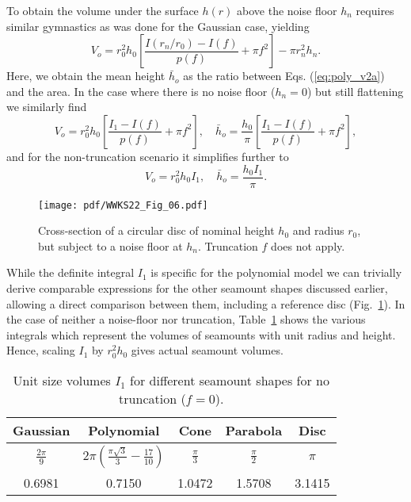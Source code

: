 To obtain the volume under the surface $h(r)$ above the noise floor $h_n$ requires similar gymnastics
as was done for the Gaussian case, yielding
\begin{equation}
	V_o = r_0^2 h_0 \left [ \frac{I(r_n/r_0) - I(f)}{p(f)} + \pi f^2 \right ] - \pi r_n^2h_n.
	\label{eq:poly_v2a}
\end{equation}
Here, we obtain the mean height $\bar{h}_o$ as the ratio between Eqs. (\ref{eq:poly_v2a}) and the area.
In the case where there is no noise floor ($h_n = 0$) but still flattening we similarly find
\begin{equation*}
	V_o = r_0^2 h_0 \left [ \frac{I_1 - I(f)}{p(f)} + \pi f^2 \right ],\quad\bar{h}_o = \frac{h_0}{\pi}\left [ \frac{I_1 - I(f)}{p(f)} + \pi f^2 \right ],
\end{equation*}
and for the non-truncation scenario it simplifies further to
\begin{equation*}
	V_o = r_0^2 h_0 I_1, \quad \bar{h}_o = \frac{h_0 I_1}{\pi}.
\end{equation*}

\begin{figure}
\centering
\noindent\texttt{[image: pdf/WWKS22\_Fig\_06.pdf]}
\caption{Cross-section of a circular disc of nominal height $h_0$ and radius
$r_0$, but subject to a noise floor at $h_n$. Truncation $f$ does not apply.}
\label{WWKS22_Fig_06}
\end{figure}

While the definite integral $I_1$ is specific for the polynomial model
we can trivially derive comparable expressions for the other seamount shapes discussed earlier,
allowing a direct comparison between them, including a reference disc (Fig.~\ref{WWKS22_Fig_06}). In the
case of neither a noise-floor nor truncation, Table~\ref{tbl:Ival} shows the various integrals which represent
the volumes of seamounts with unit radius and height.  Hence, scaling $I_1$ by $r_0^2 h_0$
gives actual seamount volumes.

\begin{table}
\centering
\caption{Unit size volumes $I_1$ for different seamount shapes for no truncation ($f = 0$).}
\begin{tabular}{c c c c c} \hline
  \bf{Gaussian}  &                               \bf{Polynomial}                  &  \bf{Cone}  &    \bf{Parabola}    & \bf{Disc}  \\ \hline
$\frac{2\pi}{9}$ & $2 \pi\left (\frac{\pi \sqrt{3}}{3} - \frac{17}{10} \right )$ & $\frac{\pi}{3}$ & $\frac{\pi}{2}$ &   $\pi$    \\ 
      0.6981      &                               0.7150                           &      1.0472     &       1.5708    &   3.1415   \\ \hline
\end{tabular}
\label{tbl:Ival}
\end{table}

